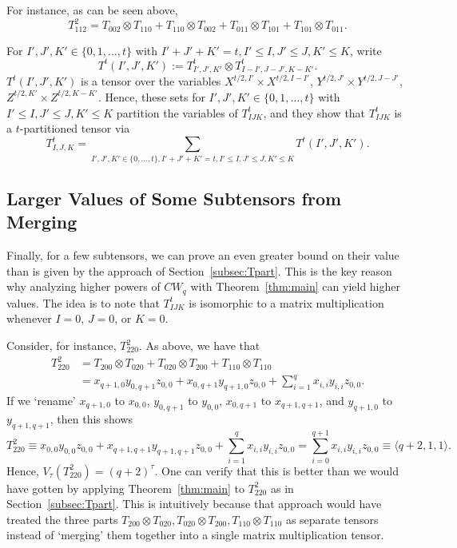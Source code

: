 \documentclass{theoretics}
\begin{document}
For instance, as can be seen above, $$T^2_{112}=T_{002}\otimes T_{110} + T_{110}\otimes T_{002} + T_{011}\otimes T_{101} + T_{101}\otimes T_{011}.$$

For $I',J',K' \in \{0,1,\ldots,t\}$ with $I'+J'+K'=t, I'\leq I,J'\leq J, K'\leq K$, write $$T^{t}(I',J',K'):=T^t_{I',J',K'}\otimes T^t_{I-I',J-J',K-K'}.$$
$T^{t}(I',J',K')$ is a tensor over the variables $X^{t/2,I'} \times X^{t/2,I-I'}$, $Y^{t/2,J'} \times Y^{t/2,J-J'}$, $Z^{t/2,K'} \times Z^{t/2,K-K'}$. Hence, these sets for $I',J',K' \in \{0,1,\ldots,t\}$ with $I'\leq I,J'\leq J, K'\leq K$ partition the variables of $T^{t}_{IJK}$, and they show that $T^{t}_{IJK}$ is a $t$-partitioned tensor via
$$T^{t}_{I,J,K} = \sum_{I',J',K'\in \{0,\ldots,t\}, I'+J'+K'=t, I'\leq I,J'\leq J, K'\leq K} T^{t}(I',J',K').$$

\subsection{Larger Values of Some Subtensors from Merging}

Finally, for a few subtensors, we can prove an even greater bound on their value than is given by the approach of Section~\ref{subsec:Tpart}. This is the key reason why analyzing higher powers of $CW_q$ with Theorem~\ref{thm:main} can yield higher values. The idea is to note that $T^t_{IJK}$ is isomorphic to a matrix multiplication whenever $I=0$, $J=0$, or $K=0$. 

Consider, for instance, $T^2_{220}$. As above, we have that
\begin{align*}
    T^2_{220} &= T_{200} \otimes T_{020} + T_{020} \otimes T_{200} + T_{110} \otimes T_{110} \\
    &= x_{q+1,0} y_{0,q+1} z_{0,0} + x_{0,q+1} y_{q+1,0} z_{0,0} + \sum_{i=1}^q x_{i,i} y_{i,i} z_{0,0}.
\end{align*}
If we `rename' $x_{q+1,0}$ to $x_{0,0}$, $y_{0,q+1}$ to $y_{0,0}$, $x_{0,q+1}$ to $x_{q+1,q+1}$, and $y_{q+1,0}$ to $y_{q+1,q+1}$, then this shows $$T^2_{220} \equiv x_{0,0} y_{0,0} z_{0,0} + x_{q+1,q+1} y_{q+1,q+1} z_{0,0} + \sum_{i=1}^q x_{i,i} y_{i,i} z_{0,0} = \sum_{i=0}^{q+1} x_{i,i} y_{i,i} z_{0,0} \equiv \langle q+2,1,1 \rangle.$$
Hence, $V_\tau(T^2_{220}) = (q+2)^\tau$. One can verify that this is better than we would have gotten by applying Theorem~\ref{thm:main} to $T^2_{220}$ as in Section~\ref{subsec:Tpart}. This is intuitively because that approach would have treated the three parts  $T_{200} \otimes T_{020}, T_{020} \otimes T_{200}, T_{110} \otimes T_{110}$ as separate tensors instead of `merging' them together into a single matrix multiplication tensor.
\end{document}
